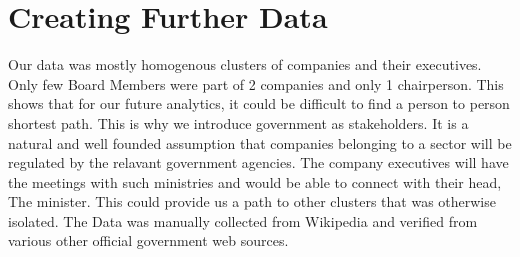 \documentclass[12pt]{article}
\begin{document}
\section{Creating Further Data}
Our data was mostly homogenous clusters of companies and their executives. Only few Board Members were part of 2 companies and only 1 chairperson. This shows that for our future analytics, it could be difficult to find a person to person shortest path. This is why we introduce government as stakeholders. It is a natural and well founded assumption that companies belonging to a sector will be regulated by the relavant government agencies. The company executives will have the meetings with such ministries and would be able to connect with their head, The minister. This could provide us a path to other clusters that was otherwise isolated. The Data was manually collected from Wikipedia and verified from various other official government web sources.
\end{document}
